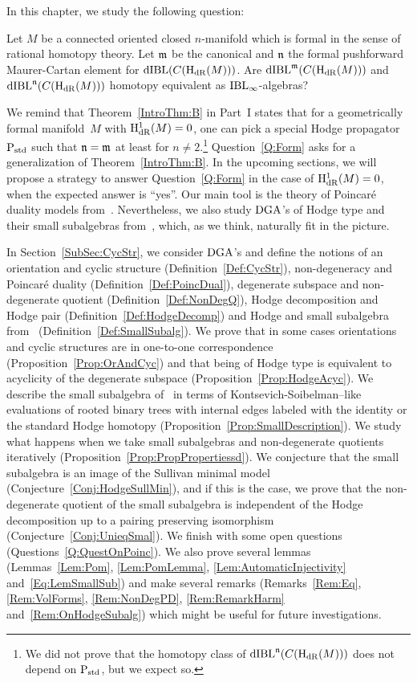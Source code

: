 \documentclass[\MainFolder/Text.tex]{subfiles}
\begin{document}
In this chapter, we study the following question:
\begin{Question}\label{Q:Form}
Let $M$ be a connected oriented closed $n$-manifold which is formal in the sense of rational homotopy theory. Let $\mathfrak{m}$ be the canonical and $\mathfrak{n}$ the formal pushforward Maurer-Cartan element for $\mathrm{dIBL}(C(\mathrm{H}_{\mathrm{dR}}(M)))$. Are $\mathrm{dIBL}^{\mathfrak{m}}(C(\mathrm{H}_{\mathrm{dR}}(M)))$ and $\mathrm{dIBL}^{\mathfrak{n}}(C(\mathrm{H}_{\mathrm{dR}}(M)))$ homotopy equivalent as $\mathrm{IBL}_\infty$-algebras?
\end{Question}
We remind that Theorem~\ref{IntroThm:B} in Part~I states that for a geometrically formal manifold~$M$ with $\mathrm{H}_{\mathrm{dR}}^1(M) = 0$, one can pick a special Hodge propagator $\mathrm{P}_{\mathrm{std}}$ such that $\mathfrak{n} = \mathfrak{m}$ at least for $n\neq 2$.\footnote{We did not prove that the homotopy class of $\mathrm{dIBL}^{\mathfrak{n}}(C(\mathrm{H}_{\mathrm{dR}}(M)))$ does not depend on $\mathrm{P}_{\mathrm{std}}$, but we expect so.} Question~\ref{Q:Form} asks for a generalization of Theorem~\ref{IntroThm:B}. In the upcoming sections, we will propose a strategy to answer Question~\ref{Q:Form} in the case of $\mathrm{H}_{\mathrm{dR}}^1(M) = 0$, when the expected answer is ``yes''. Our main tool is the theory of Poincar\'e duality models from~\cite{Lambrechts2007}. Nevertheless, we also study $\mathrm{DGA}$'s of Hodge type and their small subalgebras from~\cite{Van2019}, which, as we think, naturally fit in the picture.

In Section~\ref{SubSec:CycStr}, we consider $\mathrm{DGA}$'s and define the notions of an orientation and cyclic structure (Definition~\ref{Def:CycStr}), non-degeneracy and Poincar\'e duality (Definition~\ref{Def:PoincDual}), degenerate subspace and non-degenerate quotient (Definition~\ref{Def:NonDegQ}), Hodge decomposition and Hodge pair (Definition~\ref{Def:HodgeDecomp}) and Hodge and small subalgebra from~\cite{Van2019} (Definition~\ref{Def:SmallSubalg}). We prove that in some cases orientations and cyclic structures are in one-to-one correspondence (Proposition~\ref{Prop:OrAndCyc}) and that being of Hodge type is equivalent to acyclicity of the degenerate subspace (Proposition~\ref{Prop:HodgeAcyc}). We describe the small subalgebra of~\cite{Van2019} in terms of Kontsevich-Soibelman--like evaluations of rooted binary trees with internal edges labeled with the identity or the standard Hodge homotopy (Proposition~\ref{Prop:SmallDescription}). We study what happens when we take small subalgebras and non-degenerate quotients iteratively (Proposition~\ref{Prop:PropPropertiessd}). We conjecture that the small subalgebra is an image of the Sullivan minimal model (Conjecture~\ref{Conj:HodgeSullMin}), and if this is the case, we prove that the non-degenerate quotient of the small subalgebra is independent of the Hodge decomposition up to a pairing preserving isomorphism (Conjecture~\ref{Conj:UnieqSmal}). We finish with some open questions (Questions~\ref{Q:QuestOnPoinc}). We also prove several lemmas (Lemmas~\ref{Lem:Pom}, \ref{Lem:PomLemma}, \ref{Lem:AutomaticInjectivity} and~\ref{Eq:LemSmallSub}) and make several remarks (Remarks~\ref{Rem:Eq}, \ref{Rem:VolForms}, \ref{Rem:NonDegPD}, \ref{Rem:RemarkHarm} and~\ref{Rem:OnHodgeSubalg}) which might be useful for future investigations.
\end{document}
